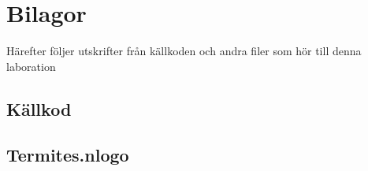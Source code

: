 \documentclass[titlepage, a4paper, 12pt]{article}
\begin{document}




\newpage
\appendix
{}
\section{Bilagor}\label{sec:kallkod}
Härefter följer utskrifter från källkoden och andra filer som hör till
denna laboration

\subsection{Källkod}
\subsection{Termites.nlogo}\label{Termites.nlogo}
\begin{footnotesize}
  
\end{footnotesize}
\end{document}
